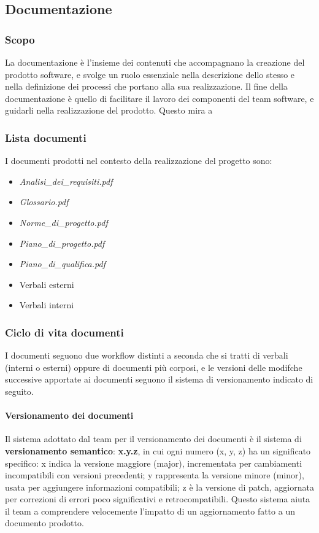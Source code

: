 \subsection{Documentazione}

\subsubsection{Scopo}
La documentazione è l'insieme dei contenuti che accompagnano la creazione 
del prodotto software, e svolge un ruolo essenziale nella descrizione 
dello stesso e nella definizione dei processi che portano alla sua realizzazione.
Il fine della documentazione è quello di facilitare il lavoro dei componenti del
team software, e guidarli nella realizzazione del prodotto. Questo mira a

\subsubsection{Lista documenti}
I documenti prodotti nel contesto della realizzazione del progetto sono:
\begin{itemize}
    \item \textit{Analisi\_dei\_requisiti.pdf}
    \item \textit{Glossario.pdf}
    \item \textit{Norme\_di\_progetto.pdf}
    \item \textit{Piano\_di\_progetto.pdf}
    \item \textit{Piano\_di\_qualifica.pdf}
    \item Verbali esterni
    \item Verbali interni
\end{itemize}

\subsubsection{Ciclo di vita documenti}
I documenti seguono due workflow distinti a seconda che si tratti di verbali 
(interni o esterni) oppure di documenti più corposi, e le versioni delle modifche 
successive apportate ai documenti seguono il sistema di versionamento indicato di seguito.\\

    \paragraph{Versionamento dei documenti}
    Il sistema adottato dal team per il versionamento dei documenti è il sistema di
    \textbf{versionamento semantico}: \textbf{x.y.z}, in cui ogni numero (x, y, z) 
    ha un significato specifico: x indica la versione maggiore (major), incrementata 
    per cambiamenti incompatibili con versioni precedenti; y rappresenta la versione 
    minore (minor), usata per aggiungere informazioni compatibili; z è la versione di 
    patch, aggiornata per correzioni di errori poco significativi e retrocompatibili.
    Questo sistema aiuta il team a comprendere velocemente l'impatto di un aggiornamento
    fatto a un documento prodotto.

